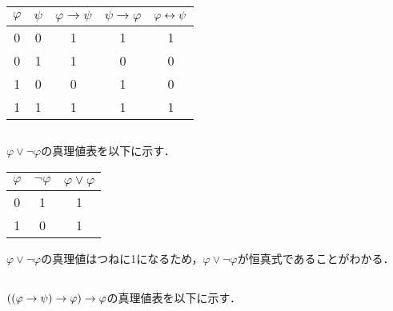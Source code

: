 \begin{table}[htbp]
	\centering
	\begin{tabular}{cc|ccc}
		\hline
		\(\varphi\) & \(\psi\) & \(\varphi \to \psi\) & \(\psi \to \varphi\) & \(\varphi \leftrightarrow \psi\) \\ \hline
		0           & 0        & 1                    & 1                    & 1                              \\
		0           & 1        & 1                    & 0                    & 0                              \\
		1           & 0        & 0                    & 1                    & 0                              \\
		1           & 1        & 1                    & 1                    & 1                              \\
		\hline
	\end{tabular}
\end{table}

\subsection*{}

\(\varphi \lor \lnot \varphi\)の真理値表を以下に示す．

\begin{table}[htbp]
	\centering
	\begin{tabular}{c|cc}
		\hline
		\(\varphi\) & \(\lnot \varphi\) & \(\varphi \lor \varphi\) \\ \hline
		0           & 1                 & 1                        \\
		1           & 0                 & 1                        \\
		\hline
	\end{tabular}
\end{table}

\(\varphi \lor \lnot \varphi\)の真理値はつねに1になるため，\(\varphi \lor \lnot \varphi\)が恒真式であることがわかる．

\subsection*{}

\(\paren{\paren{\varphi \to \psi} \to \varphi} \to \varphi\)の真理値表を以下に示す．

